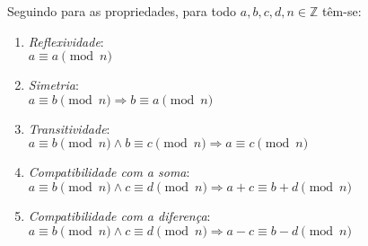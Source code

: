     Seguindo para as propriedades, para todo $a,b, c, d, n \in \mathbb{Z}$ têm-se:
\begin{enumerate}
    \item \textit{Reflexividade}: 
    \\
    $a \equiv a \pmod{n}$
    
    \item \textit{Simetria}: 
    \\ 
    $a \equiv b \pmod{n} \Longrightarrow b \equiv a \pmod{n}$
    
    \item \textit{Transitividade}: 
    \\
    $a \equiv b \pmod{n} \land b \equiv c \pmod{n} \Longrightarrow a \equiv c \pmod{n}$
    
    \item \textit{Compatibilidade com a soma}: 
    \\
    $a \equiv b \pmod{n} \land c \equiv d \pmod{n} \Longrightarrow a + c \equiv b + d \pmod{n}$

    \item \textit{Compatibilidade com a diferença}: 
    \\
    $a \equiv b \pmod{n} \land c \equiv d \pmod{n} \Longrightarrow a - c \equiv b - d \pmod{n}$


\end{enumerate}
